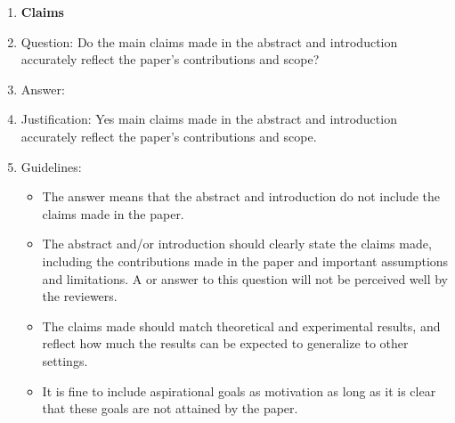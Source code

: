 \documentclass{article}
\theoremstyle{definition}
\theoremstyle{remark}
\begin{document}
\begin{enumerate}

\item {\bf Claims}
    \item[] Question: Do the main claims made in the abstract and introduction accurately reflect the paper's contributions and scope?
    \item[] Answer: \answerYes{} %
    \item[] Justification: Yes main claims made in the abstract and introduction accurately reflect the paper's contributions and scope.  
    \item[] Guidelines:
    \begin{itemize}
        \item The answer \answerNA{} means that the abstract and introduction do not include the claims made in the paper.
        \item The abstract and/or introduction should clearly state the claims made, including the contributions made in the paper and important assumptions and limitations. A \answerNo{} or \answerNA{} answer to this question will not be perceived well by the reviewers. 
        \item The claims made should match theoretical and experimental results, and reflect how much the results can be expected to generalize to other settings. 
        \item It is fine to include aspirational goals as motivation as long as it is clear that these goals are not attained by the paper. 
    \end{itemize}


\end{enumerate}
\end{document}
